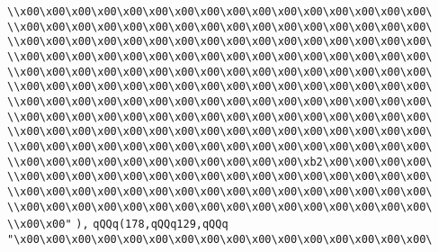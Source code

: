 \verb|\\x00\x00\x00\x00\x00\x00\x00\x00\x00\x00\x00\x00\x00\x00\x00\x00\|\newline
\verb|\\x00\x00\x00\x00\x00\x00\x00\x00\x00\x00\x00\x00\x00\x00\x00\x00\|\newline
\verb|\\x00\x00\x00\x00\x00\x00\x00\x00\x00\x00\x00\x00\x00\x00\x00\x00\|\newline
\verb|\\x00\x00\x00\x00\x00\x00\x00\x00\x00\x00\x00\x00\x00\x00\x00\x00\|\newline
\verb|\\x00\x00\x00\x00\x00\x00\x00\x00\x00\x00\x00\x00\x00\x00\x00\x00\|\newline
\verb|\\x00\x00\x00\x00\x00\x00\x00\x00\x00\x00\x00\x00\x00\x00\x00\x00\|\newline
\verb|\\x00\x00\x00\x00\x00\x00\x00\x00\x00\x00\x00\x00\x00\x00\x00\x00\|\newline
\verb|\\x00\x00\x00\x00\x00\x00\x00\x00\x00\x00\x00\x00\x00\x00\x00\x00\|\newline
\verb|\\x00\x00\x00\x00\x00\x00\x00\x00\x00\x00\x00\x00\x00\x00\x00\x00\|\newline
\verb|\\x00\x00\x00\x00\x00\x00\x00\x00\x00\x00\x00\x00\x00\x00\x00\x00\|\newline
\verb|\\x00\x00\x00\x00\x00\x00\x00\x00\x00\x00\x00\xb2\x00\x00\x00\x00\|\newline
\verb|\\x00\x00\x00\x00\x00\x00\x00\x00\x00\x00\x00\x00\x00\x00\x00\x00\|\newline
\verb|\\x00\x00\x00\x00\x00\x00\x00\x00\x00\x00\x00\x00\x00\x00\x00\x00\|\newline
\verb|\\x00\x00\x00\x00\x00\x00\x00\x00\x00\x00\x00\x00\x00\x00\x00\x00\|\newline
\verb|\\x00\x00"|\newline
\verb|),|\newline
\verb|qQQq(178,qQQq129,qQQq|\newline
\verb|"\x00\x00\x00\x00\x00\x00\x00\x00\x00\x00\x00\x00\x00\x00\x00\x00\|\newline

